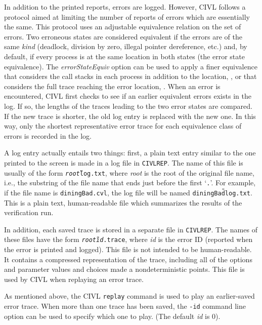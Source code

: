 In addition to the printed reports, errors are logged.  However, CIVL
follows a protocol aimed at limiting the number of reports of errors
which are essentially the same.  This protocol uses an adjustable
equivalence relation on the set of errors.  Two erroneous states are
considered equivalent if the errors are of the same \emph{kind}
(deadlock, division by zero, illegal pointer dereference, etc.) and,
by default, if every process is at the same location in both states
(the  error state equivalence).
The \emph{errorStateEquiv} option can be used to apply a finer
equivalence that considers the call stacks in each process in
addition to the location, , or that considers
the full trace reaching the error location, .
When an error is encountered, CIVL first checks to see if an earlier equivalent
errors exists in the log.  If so, the lengths of the traces leading to
the two error states are compared.  If the new trace is shorter, the
old log entry is replaced with the new one.  In this way, only the
shortest representative error trace for each equivalence class of
errors is recorded in the log.

A log entry actually entails two things: first, a plain text entry
similar to the one printed to the screen is made in a log file in
\texttt{CIVLREP}.  The name of this file is usually of the form
\texttt{\textit{root}{\U}log.txt}, where \textit{root} is the root of
the original file name, i.e., the substring of the file name that ends
just before the first `\texttt{.}'.  For example, if the file name is
\texttt{diningBad.cvl}, the log file will be named
\texttt{diningBad{\U}log.txt}.  This is a plain text, human-readable
file which summarizes the results of the verification run.

In addition, each saved trace is stored in a separate file in
\texttt{CIVLREP}.  The names of these files have the form
\texttt{\textit{root}{\U}\textit{id}.trace}, where \textit{id} is the
error ID (reported when the error is printed and logged).  This file
is not intended to be human-readable.  It contains a compressed
representation of the trace, including all of the options and
parameter values and choices made a nondeterministic points.  
This file is used by CIVL when replaying an error trace.

As mentioned above, the CIVL \texttt{replay} command is used to play
an earlier-saved error trace.  When more than one trace has been
saved, the \texttt{-id} command line option can be used to specify
which one to play. (The default \emph{id} is 0).


